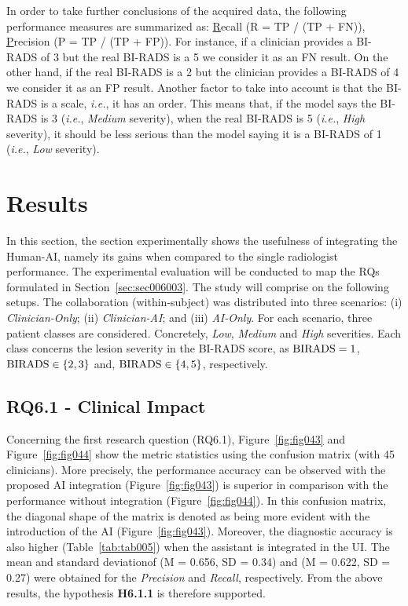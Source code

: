 In order to take further conclusions of the acquired data, the following performance measures are summarized as: \underline{R}ecall (R = \ac{TP} / (\ac{TP} + \ac{FN})), \underline{P}recision (P = \ac{TP} / (\ac{TP} + \ac{FP})).
For instance, if a clinician provides a \ac{BI-RADS} of 3 but the real \ac{BI-RADS} is a 5 we consider it as an \ac{FN} result.
On the other hand, if the real \ac{BI-RADS} is a 2 but the clinician provides a \ac{BI-RADS} of 4 we consider it as an \ac{FP} result.
Another factor to take into account is that the \ac{BI-RADS} is a scale, {\it i.e.}, it has an order.
This means that, if the model says the \ac{BI-RADS} is 3 ({\it i.e.}, {\it Medium} severity), when the real \ac{BI-RADS} is 5 ({\it i.e.}, {\it High} severity), it should be less serious than the model saying it is a \ac{BI-RADS} of 1 ({\it i.e.}, {\it Low} severity).

\section{Results}
\label{sec:sec006006}

In this section, the section experimentally shows the usefulness of integrating the Human-\ac{AI}, namely its gains when compared to the single radiologist performance.
The experimental evaluation will be conducted to map the \acp{RQ} formulated in Section~\ref{sec:sec006003}.
The study will comprise on the following setups.
The collaboration (within-subject) was distributed into three scenarios: (i) {\it Clinician-Only}; (ii) {\it Clinician-AI}; and (iii) {\it AI-Only}.
For each scenario, three patient classes are considered.
Concretely, {\it Low}, {\it Medium} and {\it High} severities.
Each class concerns the lesion severity in the \ac{BI-RADS} score, as ${\rm BIRADS} = 1$, ${\rm BIRADS} \in\{2, 3\}$ and, ${\rm BIRADS}\in\{4, 5\}$, respectively.

\subsection{RQ6.1 - Clinical Impact}
\label{sec:sec006006001}

Concerning the first research question (RQ6.1), Figure~\ref{fig:fig043} and Figure~\ref{fig:fig044} show the metric statistics using the confusion matrix (with 45 clinicians).
More precisely, the performance accuracy can be observed with the proposed \ac{AI} integration (Figure~\ref{fig:fig043}) is superior in comparison with the performance without integration (Figure~\ref{fig:fig044}).
In this confusion matrix, the diagonal shape of the matrix is denoted as being more evident with the introduction of the \ac{AI} (Figure~\ref{fig:fig043}).
Moreover, the diagnostic accuracy is also higher (Table~\ref{tab:tab005}) when the assistant is integrated in the \ac{UI}.
The mean and standard deviation\footnotemark[40] of (M = 0.656, SD = 0.34) and 
(M = 0.622, SD = 0.27) were obtained for the {\it Precision} and {\it Recall}, respectively.
From the above results, the hypothesis {\bf H6.1.1} is therefore supported.

